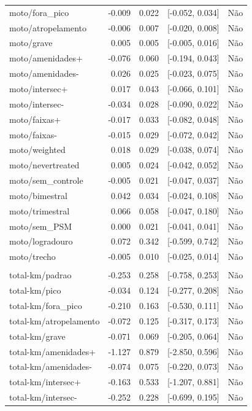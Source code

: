 \begin{longtable}{lrrcl}
moto/fora\_pico & -0.009 & 0.022 & {}[-0.052, 0.034] & Não\\
moto/atropelamento & -0.006 & 0.007 & {}[-0.020, 0.008] & Não\\
moto/grave & 0.005 & 0.005 & {}[-0.005, 0.016] & Não\\
moto/amenidades+ & -0.076 & 0.060 & {}[-0.194, 0.043] & Não\\
moto/amenidades- & 0.026 & 0.025 & {}[-0.023, 0.075] & Não\\
moto/intersec+ & 0.017 & 0.043 & {}[-0.066, 0.101] & Não\\
moto/intersec- & -0.034 & 0.028 & {}[-0.090, 0.022] & Não\\
moto/faixas+ & -0.017 & 0.033 & {}[-0.082, 0.048] & Não\\
moto/faixas- & -0.015 & 0.029 & {}[-0.072, 0.042] & Não\\
moto/weighted & 0.018 & 0.029 & {}[-0.038, 0.074] & Não\\
moto/nevertreated & 0.005 & 0.024 & {}[-0.042, 0.052] & Não\\
moto/sem\_controle & -0.005 & 0.021 & {}[-0.047, 0.037] & Não\\
moto/bimestral & 0.042 & 0.034 & {}[-0.024, 0.108] & Não\\
moto/trimestral & 0.066 & 0.058 & {}[-0.047, 0.180] & Não\\
moto/sem\_PSM & 0.000 & 0.021 & {}[-0.041, 0.041] & Não\\
moto/logradouro & 0.072 & 0.342 & {}[-0.599, 0.742] & Não\\
moto/trecho & -0.005 & 0.010 & {}[-0.025, 0.014] & Não\\
 &  &  &  & \\
total-km/padrao & -0.253 & 0.258 & {}[-0.758, 0.253] & Não\\
total-km/pico & -0.034 & 0.124 & {}[-0.277, 0.208] & Não\\
total-km/fora\_pico & -0.210 & 0.163 & {}[-0.530, 0.111] & Não\\
total-km/atropelamento & -0.072 & 0.125 & {}[-0.317, 0.173] & Não\\
total-km/grave & -0.071 & 0.069 & {}[-0.205, 0.064] & Não\\
total-km/amenidades+ & -1.127 & 0.879 & {}[-2.850, 0.596] & Não\\
total-km/amenidades- & -0.074 & 0.075 & {}[-0.220, 0.073] & Não\\
total-km/intersec+ & -0.163 & 0.533 & {}[-1.207, 0.881] & Não\\
total-km/intersec- & -0.252 & 0.228 & {}[-0.699, 0.195] & Não\\

\end{longtable}
